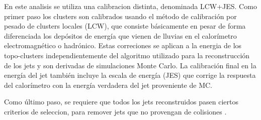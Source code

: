 En este analisis se utiliza una calibracion distinta, denominada LCW+JES. Como
primer paso los clusters son calibrados usando el método de calibración por
pesado de clusters locales (LCW), que consiste básicamente en pesar de forma
diferenciada los depósitos de energía que vienen de lluvias en el calorímetro
electromagnético o hadrónico. Estas correciones se aplican a la energia de los
topo-clusters independientemente del algoritmo utilizado para la reconstrucción
de los jets y son derivadas de simulaciones Monte Carlo. La calibración final en
la energía del jet también incluye la escala de energía (JES) que corrige la
respuesta del calorímetro con la energía verdadera del jet proveniente de MC.






Como último paso, se requiere que todos los jets reconstruidos pasen ciertos
criterios de seleccion, para remover jets que no provengan de colisiones \cite{Aad:2010ad,ATLAS-CONF-2010-038}.



